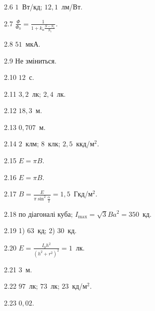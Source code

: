 \protect \section *{}
\begin{Solution}{2.{6}}
	$1$~Вт/кд;  $12,1$~лм/Вт.
\end{Solution}
\begin{Solution}{2.{7}}
	$\frac{\Phi}{\Phi_0} = \frac{1}{1 + k_\text{п}\frac{S - S_1}{S_1}}$.
\end{Solution}
\begin{Solution}{2.{8}}
	$51$~мкА.
\end{Solution}
\begin{Solution}{2.{9}}
	Не зміниться.
\end{Solution}
\begin{Solution}{2.{10}}
	$12$~с.
\end{Solution}
\begin{Solution}{2.{11}}
	$3,2$~лк; $2,4$~лк.
\end{Solution}
\begin{Solution}{2.{12}}
	$18,3$~м.
\end{Solution}
\begin{Solution}{2.{13}}
	$0,707$~м.
\end{Solution}
\begin{Solution}{2.{14}}
	$2$~клм; $8$~клк; $2,5$~ккд/м$^2$.
\end{Solution}
\begin{Solution}{2.{15}}
	$E = \pi B$.
\end{Solution}
\begin{Solution}{2.{16}}
	$E = \pi B$.
\end{Solution}
\begin{Solution}{2.{17}}
	$B = \frac{E}{\pi\sin^2\frac{\alpha}{2}} = 1,5$~Гкд/м$^2$.
\end{Solution}
\begin{Solution}{2.{18}}
	по діагоналі куба; $I_{\max} = \sqrt3 Ba^2 = 350$~кд.
\end{Solution}
\begin{Solution}{2.{19}}
	1) $63$~кд; 2) $30$~кд.
\end{Solution}
\begin{Solution}{2.{20}}
	$E = \frac{I_0h^2}{(h^2 + r^2)^2} = 1$~лк.
\end{Solution}
\begin{Solution}{2.{21}}
	$3$~м.
\end{Solution}
\begin{Solution}{2.{22}}
	$97$~лк; $73$~лк; $23$~кд/м$^2$.
\end{Solution}
\begin{Solution}{2.{23}}
	$0,02$.
\end{Solution}
